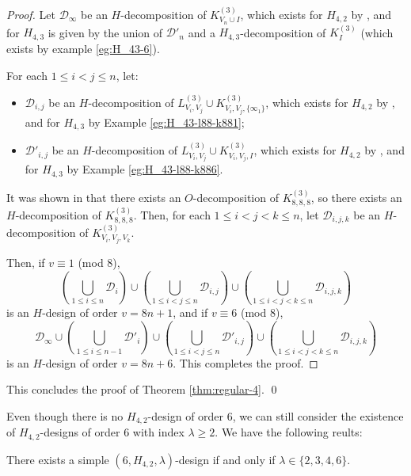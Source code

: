 \begin{proof}
Let $\mathcal{D}_\infty$ be an $H$-decomposition of $K_{V_n \cup I}^{(3)}$,
  which exists for $H_{4,2}$ by \cite{bryant}, and for $H_{4,3}$ is given by
  the union of $\mathcal{D}'_n$ and a $H_{4,3}$-decomposition of $K_{I}^{(3)}$ (which exists by example \ref{eg:H_43-6}).


For each $1 \leq i < j \leq n$, let:
\begin{itemize}
  \item $\mathcal{D}_{i,j}$ be an $H$-decomposition of $L_{V_i,V_j}^{(3)} \cup K_{V_i,V_j,\{\infty_1\}}^{(3)}$,
  which exists for $H_{4,2}$ by \cite{bryant}, and for $H_{4,3}$ by Example \ref{eg:H_43-l88-k881};
  \item $\mathcal{D}'_{i,j}$ be an $H$-decomposition of $L_{V_i,V_j}^{(3)} \cup K_{V_i,V_j,I}^{(3)}$,
  which exists for $H_{4,2}$ by \cite{bryant}, and for $H_{4,3}$ by Example \ref{eg:H_43-l88-k886}.
\end{itemize}

It was shown in \cite{hanani} that there exists an $O$-decomposition of $K_{8,8,8}^{(3)}$, so there exists an $H$-decomposition of $K_{8,8,8}^{(3)}$.
Then, for each $1 \leq i < j < k \leq n$, let $\mathcal{D}_{i,j,k}$ be an $H$-decomposition of $K_{V_i,V_j,V_k}^{(3)}$.

Then, if $v \equiv 1$ (mod 8),
\[
    \left( \bigcup_{1 \leq i \leq n} \mathcal{D}_i \right)
    \cup \left( \bigcup_{1 \leq i < j \leq n} \mathcal{D}_{i,j} \right)
    \cup \left( \bigcup_{1 \leq i < j < k \leq n} \mathcal{D}_{i,j,k} \right)
\]
is an $H$-design of order $v = 8n+1$, and if $v \equiv 6$ (mod 8),
\[
    \mathcal{D}_\infty \cup \left( \bigcup_{1 \leq i \leq n-1}
    \mathcal{D}'_i \right) \cup \left( \bigcup_{1 \leq i < j \leq n}
    \mathcal{D}'_{i,j} \right) \cup \left( \bigcup_{1
    \leq i < j < k \leq n} \mathcal{D}_{i,j,k} \right)
\]
is an $H$-design of order $v = 8n+6$. This completes the proof.

\end{proof}

This concludes the proof of Theorem \ref{thm:regular-4}. \qed

Even though there is no $H_{4,2}$-design of order $6$, we can still consider the existence of $H_{4,2}$-designs of order $6$ with index $\lambda \geq 2$.
We have the following reults:

\begin{theorem} \label{thm:H_42-6-simple}
There exists a simple $(6, H_{4,2}, \lambda)$-design if and only if $\lambda \in \{2, 3, 4, 6\}$.
\end{theorem}

